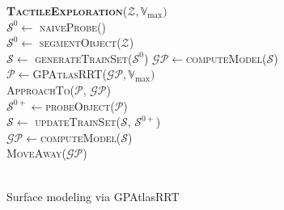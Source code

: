 \begin{algorithm}[t]
\textbf{\textsc{TactileExploration}}($\mathcal{Z}, \mathbb{V}_{\max})$\\ %
\LinesNumbered
\DontPrintSemicolon
\SetAlgoVlined {} 
  \label{ini_gp} 
  {
    $\mathcal{S}^0 \leftarrow $ \textsc{naiveProbe}() \\
  }
  \Else
  {
    $\mathcal{S}^0 \leftarrow $ \textsc{segmentObject}($\mathcal{Z}$) \\
  }
  $\mathcal{S} \leftarrow$ \textsc{generateTrainSet}($\mathcal{S}^0$)
  $\mathcal{GP} \leftarrow $\textsc{computeModel}($\mathcal{S}$) \label{fini_ini_gp} \\
  {
    $\mathcal{P} \leftarrow $\textsc{GPAtlasRRT}($\mathcal{GP}, \mathbb{V}_{\max})$ \label{exploration} \\
    {
      \textsc{ApproachTo}($\mathcal{P}$, $\mathcal{GP}$) \label{approach} \\
      $\mathcal{S}^{0+} \leftarrow $\textsc{probeObject}($\mathcal{P}$) \label{probe} \\
      $\mathcal{S} \leftarrow$ \textsc{updateTrainSet($\mathcal{S}$, $\mathcal{S}^{0+}$)} \label{update_training} \\
      $\mathcal{GP} \leftarrow $\textsc{computeModel}($\mathcal{S}$) \label{re-compute} \\
      \textsc{MoveAway}($\mathcal{GP}$) \label{away} \\
    }
    \Else
    { 
       \label{solutionfound} \\
    }
  }
\caption{Surface modeling via GPAtlasRRT} \label{alg:solution}
\end{algorithm}


